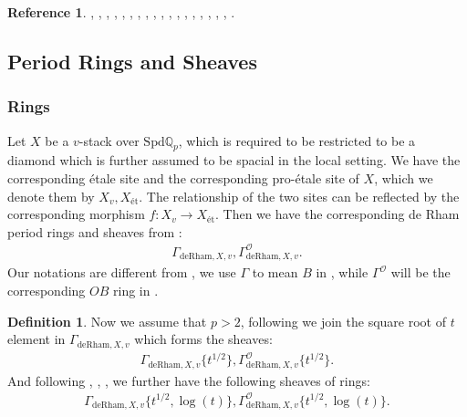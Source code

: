 \documentclass[12pt]{book}
\theoremstyle{definition}
\newtheorem{definition}{Definition}
\newtheorem{reference}{Reference}
\begin{document}
\begin{reference}
\cite{Sch1}, \cite{Sch2}, \cite{FS}, \cite{KL1}, \cite{KL2}, \cite{BL1}, \cite{BL2}, \cite{BS}, \cite{BHS}, \cite{Fon1}, \cite{CS1}, \cite{CS2}, \cite{BK}, \cite{BBK}, \cite{BBBK}, \cite{KKM}, \cite{KM}, \cite{LZ}, \cite{M}.
\end{reference}

\subsection{Period Rings and Sheaves}

\subsubsection{Rings}

\noindent Let $X$ be a $v$-stack over $\mathrm{Spd}\mathbb{Q}_p$, which is required to be restricted to be a diamond which is further assumed to be spacial in the local setting. We have the corresponding \'etale site and the corresponding pro-\'etale site of $X$, which we denote them by $X_{v},X_\text{\'et}$. The relationship of the two sites can be reflected by the corresponding morphism $f:X_{v}\longrightarrow X_\text{\'et}$. Then we have the corresponding de Rham period rings and sheaves from \cite{Sch1}:
\begin{align}
\Gamma_{\text{deRham},X,v}, \Gamma^\mathcal{O}_{\text{deRham},X,v}.
\end{align}
Our notations are different from \cite{Sch1}, we use $\Gamma$ to mean $B$ in \cite{Sch1}, while $\Gamma^\mathcal{O}$ will be the corresponding $OB$ ring in \cite{Sch1}.\\

\begin{definition}
\indent Now we assume that $p>2$, following \cite{BS} we join the square root of $t$ element in $\Gamma_{\text{deRham},X,v}$ which forms the sheaves:
\begin{align}
\Gamma_{\text{deRham},X,v}\{t^{1/2}\},\Gamma^\mathcal{O}_{\text{deRham},X,v}\{t^{1/2}\}.
\end{align}
And following \cite{BL1}, \cite{BL2}, \cite{Fon1}, \cite{BHS} we further have the following sheaves of rings:
\begin{align}
\Gamma_{\text{deRham},X,v}\{t^{1/2},\log(t)\},\Gamma^\mathcal{O}_{\text{deRham},X,v}\{t^{1/2},\log(t)\}.
\end{align}
\end{definition}
\end{document}
